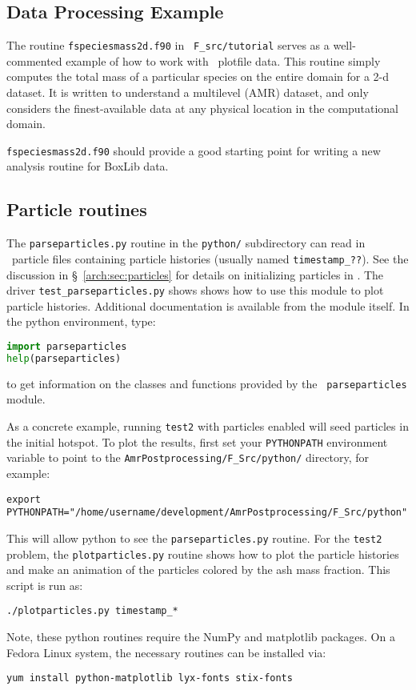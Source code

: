 \subsection{Data Processing Example}

The routine {\tt fspeciesmass2d.f90} in {\tt
  F\_src/tutorial} serves as a well-commented example of how
to work with \maestro\ plotfile data.  This routine simply computes
the total mass of a particular species on the entire domain for a 2-d
dataset.  It is written to understand a multilevel (AMR) dataset, and
only considers the finest-available data at any physical location in
the computational domain.

{\tt fspeciesmass2d.f90} should provide a good starting point for
writing a new analysis routine for BoxLib data.

\subsection{Particle routines}

\label{analysis:sec:particles}

The {\tt parseparticles.py} routine in the {\tt python/} subdirectory
can read in \maestro\ particle files containing particle histories
(usually named {\tt timestamp\_??}).  See the discussion in
\S~\ref{arch:sec:particles} for details on initializing particles in
\maestro.  The driver {\tt test\_parseparticles.py} shows shows how to
use this module to plot particle histories.  Additional documentation
is available from the module itself.  In the python environment,
type:
\begin{lstlisting}[language=Python]
import parseparticles
help(parseparticles)
\end{lstlisting}
to get information on the classes and functions provided by the {\tt
  parseparticles} module.

As a concrete example, running {\tt test2} with particles enabled
will seed particles in the initial hotspot.  To plot the results,
first set your {\tt PYTHONPATH} environment variable to point to the
{\tt AmrPostprocessing/F\_Src/python/} directory, for example:
\begin{verbatim}
export PYTHONPATH="/home/username/development/AmrPostprocessing/F_Src/python"
\end{verbatim}
This will allow python to see the {\tt parseparticles.py} routine.
For the {\tt test2} problem, the {\tt plotparticles.py} routine shows
how to plot the particle histories and make an animation of the
particles colored by the ash mass fraction.  This script is run as:
\begin{verbatim}
./plotparticles.py timestamp_*
\end{verbatim}

Note, these python routines require the NumPy and matplotlib packages.
On a Fedora Linux system, the necessary routines can be installed via:
\begin{verbatim}
yum install python-matplotlib lyx-fonts stix-fonts
\end{verbatim}




